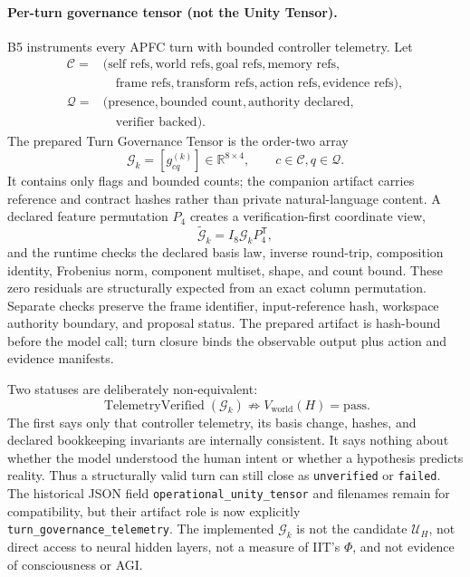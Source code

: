 \documentclass[10pt,twocolumn]{article}
\theoremstyle{definition}
\theoremstyle{plain}
\theoremstyle{remark}
\newcommand{\file}[1]{\nolinkurl{#1}}
\begin{document}
\paragraph{Per-turn governance tensor (not the Unity Tensor).}
\label{sec:operational-turn-tensor}
B5 instruments every APFC turn with bounded controller telemetry.  Let
\begin{align}
\mathcal C={}&(\text{self refs},\text{world refs},\text{goal refs},\text{memory refs},\\
&\quad\text{frame refs},\text{transform refs},\text{action refs},\text{evidence refs}),\\
\mathcal Q={}&(\text{presence},\text{bounded count},\text{authority declared},\\
&\quad\text{verifier backed}).
\end{align}
The prepared Turn Governance Tensor is the order-two array
\begin{equation}
\mathcal G_k=[g^{(k)}_{cq}]\in\mathbb R^{8\times4},\qquad c\in\mathcal C, q\in\mathcal Q.
\label{eq:operational-turn-tensor}
\end{equation}
It contains only flags and bounded counts; the companion artifact carries reference and contract hashes rather than private natural-language content.  A declared feature permutation $P_4$ creates a verification-first coordinate view,
\begin{equation}
\widetilde{\mathcal G}_k=I_8\mathcal G_kP_4^{\mathsf T},
\label{eq:operational-turn-basis}
\end{equation}
and the runtime checks the declared basis law, inverse round-trip, composition identity, Frobenius norm, component multiset, shape, and count bound.  These zero residuals are structurally expected from an exact column permutation.  Separate checks preserve the frame identifier, input-reference hash, workspace authority boundary, and proposal status.  The prepared artifact is hash-bound before the model call; turn closure binds the observable output plus action and evidence manifests.

Two statuses are deliberately non-equivalent:
\begin{equation}
\operatorname{TelemetryVerified}(\mathcal G_k)
\nRightarrow V_{\mathrm{world}}(H)=\mathrm{pass}.
\label{eq:representation-not-outcome}
\end{equation}
The first says only that controller telemetry, its basis change, hashes, and declared bookkeeping invariants are internally consistent.  It says nothing about whether the model understood the human intent or whether a hypothesis predicts reality.  Thus a structurally valid turn can still close as \file{unverified} or \file{failed}.  The historical JSON field \file{operational\_unity\_tensor} and filenames remain for compatibility, but their artifact role is now explicitly \file{turn\_governance\_telemetry}.  The implemented $\mathcal G_k$ is not the candidate $\mathcal U_H$, not direct access to neural hidden layers, not a measure of IIT's $\Phi$, and not evidence of consciousness or AGI.
\end{document}
